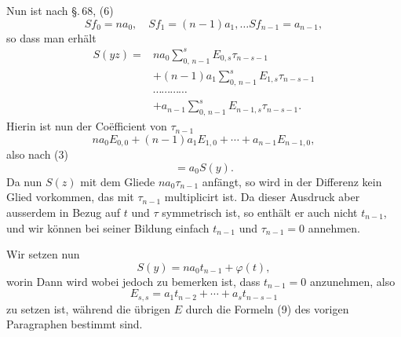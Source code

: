 Nun ist nach \S.\,68, (6)
\[
S f_0 = n a_0, \quad S f_1 = (n-1) a_1, \ldots S f_{n-1} = a_{n-1},
\]
so dass man erhält
\[
\begin{aligned}
S(y z) = {} & n a_0 \sum_{0,\,n-1}^{s} E_{0,s} \tau_{n-s-1} \\
& + (n-1) a_1 \sum_{0,\,n-1}^{s} E_{1,s} \tau_{n-s-1} \\
& \cdots\cdots\cdots\cdots \\
& + a_{n-1} \sum_{0,\,n-1}^{s} E_{n-1,s} \tau_{n-s-1}.
\end{aligned}
\]
Hierin ist nun der Coëfficient von $\tau_{n-1}$
\[
n a_0 E_{0,0} + (n-1) a_1 E_{1,0} + \cdots + a_{n-1} E_{n-1,0},
\]
also nach (3)
\[
= a_0 S(y).
\]
Da nun $S(z)$ mit dem Gliede $n a_0 \tau_{n-1}$ anfängt, so wird in
der Differenz
kein Glied vorkommen, das mit $\tau_{n-1}$ multiplicirt ist. Da dieser
Ausdruck aber ausserdem in Bezug auf $t$ und $\tau$ symmetrisch ist,
so enthält er auch nicht $t_{n-1}$, und wir können bei seiner Bildung
einfach $t_{n-1}$ und $\tau_{n-1} = 0$ annehmen.

Wir setzen nun
\[
S(y) = n a_0 t_{n-1} + \varphi(t),
\]
worin
Dann wird
wobei jedoch zu bemerken ist, dass $t_{n-1} = 0$ anzunehmen, also
\[
E_{s,s} = a_1 t_{n-2} + \cdots + a_s t_{n-s-1}
\]
zu setzen ist, während die übrigen $E$ durch die Formeln (9) des
vorigen Paragraphen bestimmt sind.
